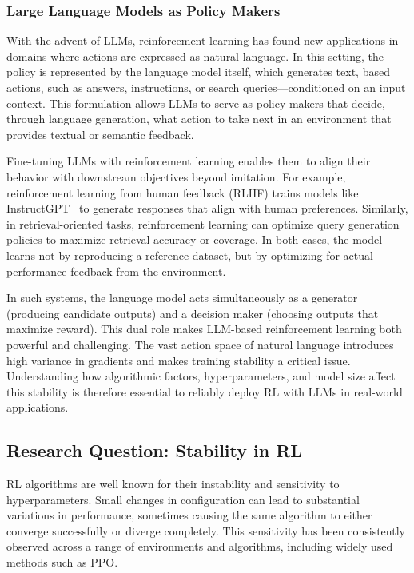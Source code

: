 \subsubsection{Large Language Models as Policy Makers}
With the advent of LLMs, reinforcement learning has found new applications in domains where actions are expressed as natural language. In this setting, the policy is represented by the language model itself, which generates text, based actions, such as answers, instructions, or search queries—conditioned on an input context. This formulation allows LLMs to serve as policy makers that decide, through language generation, what action to take next in an environment that provides textual or semantic feedback.

Fine-tuning LLMs with reinforcement learning enables them to align their behavior with downstream objectives beyond imitation. For example, reinforcement learning from human feedback (RLHF) trains models like InstructGPT~\cite{ouyang2022training} to generate responses that align with human preferences. Similarly, in retrieval-oriented tasks, reinforcement learning can optimize query generation policies to maximize retrieval accuracy or coverage. In both cases, the model learns not by reproducing a reference dataset, but by optimizing for actual performance feedback from the environment.

In such systems, the language model acts simultaneously as a generator (producing candidate outputs) and a decision maker (choosing outputs that maximize reward). This dual role makes LLM-based reinforcement learning both powerful and challenging. The vast action space of natural language introduces high variance in gradients and makes training stability a critical issue. Understanding how algorithmic factors, hyperparameters, and model size affect this stability is therefore essential to reliably deploy RL with LLMs in real-world applications.

\subsection{Research Question: Stability in RL}
RL algorithms are well known for their instability and sensitivity to hyperparameters. Small changes in configuration can lead to substantial variations in performance, sometimes causing the same algorithm to either converge successfully or diverge completely. This sensitivity has been consistently observed across a range of environments and algorithms, including widely used methods such as PPO.

